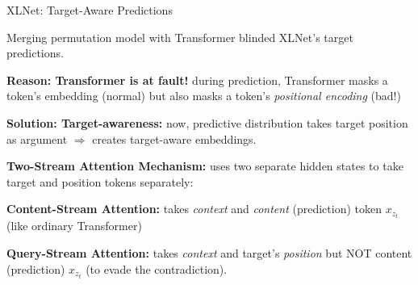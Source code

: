 \begin{frame}{XLNet: Target-Aware Predictions}

    \vspace{10pt}

    \begin{itemizeSpaced}{10pt}
        \footnotesize 
        
         Merging permutation model with Transformer blinded XLNet’s target predictions.
        
        \begin{itemizeSpaced}{0pt}
            \footnotesize 
            \item {\color{Crimson} \textbf{Reason: Transformer is at fault! }}during prediction, Transformer masks a token's embedding (normal) but also masks a token's \emph{positional encoding} (bad!)
        \end{itemizeSpaced}

        
        
        \item {\color{ForestGreen} \textbf{Solution: Target-awareness: }} now, predictive distribution takes target position as argument $\Rightarrow$ creates target-aware embeddings. 
        
        
        \item {\color{ForestGreen} \textbf{Two-Stream Attention Mechanism: }}uses two separate hidden states to take target and position tokens separately:
        
        
        \vspace{5pt}
        \begin{itemizeSpaced}{5pt}
            \footnotesize 
            
            \item \textbf{Content-Stream Attention: } takes \emph{context} and \emph{content} (prediction) token $x_{z_t}$ (like ordinary Transformer)
            
            \item \textbf{Query-Stream Attention: }takes \emph{context} and target's \emph{position} but NOT content (prediction) $x_{z_t}$ (to evade the contradiction). 
        \end{itemizeSpaced} 
        
    \end{itemizeSpaced}
\end{frame}

